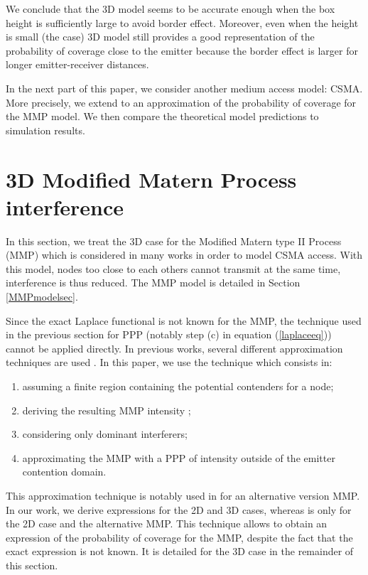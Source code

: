 \documentclass{sig-alternate-05-2015}
\begin{document}
We conclude that the 3D model seems to be accurate enough when the box height is sufficiently large to avoid border effect. Moreover, even when the height is small (the  case) 3D model still provides a good representation of the probability of coverage close to the emitter because the border effect is larger for longer emitter-receiver distances.

In the next part of this paper, we consider another medium access model: CSMA. More precisely, we extend to  an approximation of the probability of coverage for the MMP model. We then compare the theoretical model predictions to simulation results.

\section{3D Modified Matern Process interference}
\label{MMPsec}

In this section, we treat the 3D case for the Modified Matern type II Process (MMP) which is considered in many works \cite{nguyen07,elsawy13} in order to model CSMA access. With this model, nodes too close to each others cannot transmit at the same time, interference is thus reduced. The MMP model is detailed in Section \ref{MMPmodelsec}.  

Since the exact Laplace functional is not known for the MMP, the technique used in the previous section for PPP (notably step (c) in equation (\ref{laplaceeq})) cannot be applied directly. In previous works, several different approximation techniques are used \cite{nguyen07,hasan07,kaynia11,elsawy13}. In this paper, we use the technique which consists in:
\begin{enumerate}
 \item assuming a finite region containing the potential contenders for a node;
 \item deriving the resulting MMP intensity ;
 \item considering only dominant interferers;
 \item approximating the MMP with a PPP of intensity  outside of the emitter contention domain.
\end{enumerate}

This approximation technique is notably used in \cite{elsawy13} for an alternative version MMP. In our work, we derive expressions for the 2D and 3D cases, whereas \cite{elsawy13} is only for the 2D case and the alternative MMP. This technique allows to obtain an expression of the probability of coverage for the MMP, despite the fact that the exact expression is not known. It is detailed for the 3D case in the remainder of this section.
\end{document}
